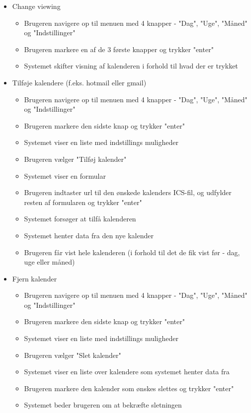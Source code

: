 \documentclass{article}
\begin{document}
\begin{itemize}
   \item Change viewing
   \begin{itemize}
   \item Brugeren navigere op til menuen med 4 knapper - "Dag", "Uge", "Måned" og "Indstillinger"
   \item Brugeren markere en af de 3 første knapper og trykker "enter"
   \item Systemet skifter visning af kalenderen i forhold til hvad der er trykket
   \end{itemize}
   \item Tilføje kalendere (f.eks. hotmail eller gmail)
   \begin{itemize}
   \item Brugeren navigere op til menuen med 4 knapper - "Dag", "Uge", "Måned" og "Indstillinger"
   \item Brugeren markere den sidste knap og trykker "enter"
   \item Systemet viser en liste med indstillings muligheder
   \item Brugeren vælger "Tilføj kalender"
   \item Systemet viser en formular
   \item Brugeren indtaster url til den ønskede kalenders ICS-fil, og udfylder resten af formularen og trykker "enter"
   \item Systemet forsøger at tilfå kalenderen
   \item Systemet henter data fra den nye kalender
   \item Brugeren får vist hele kalenderen (i forhold til det de fik vist før - dag, uge eller måned)
   \end{itemize}
   \item Fjern kalender
   \begin{itemize}
   \item Brugeren navigere op til menuen med 4 knapper - "Dag", "Uge", "Måned" og "Indstillinger"
   \item Brugeren markere den sidste knap og trykker "enter"
   \item Systemet viser en liste med indstillings muligheder
   \item Brugeren vælger "Slet kalender"
   \item Systemet viser en liste over kalendere som systemet henter data fra
   \item Brugeren markere den kalender som ønskes slettes og trykker "enter"
   \item Systemet beder brugeren om at bekræfte sletningen

\end{itemize}
\end{itemize}
\end{document}
